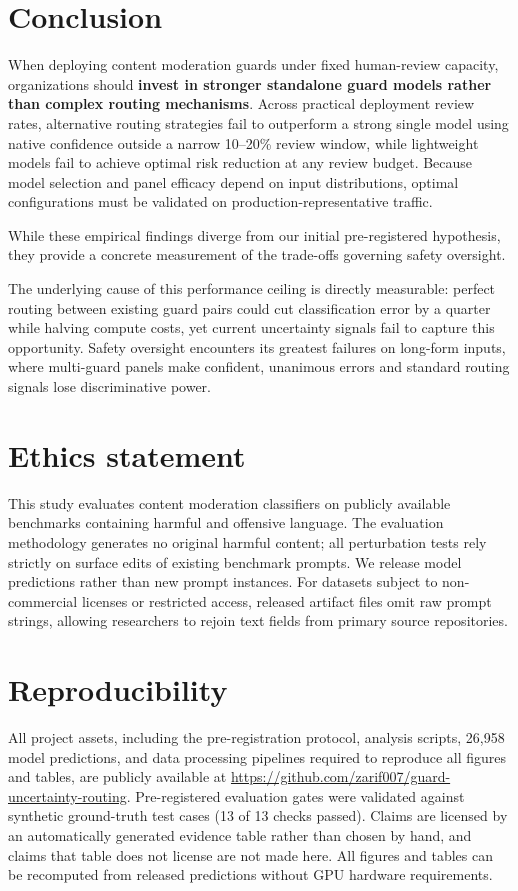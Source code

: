\documentclass[11pt]{article}
\begin{document}
\section{Conclusion}

When deploying content moderation guards under fixed human-review capacity, organizations should \textbf{invest in stronger standalone guard models rather than complex routing mechanisms}. Across practical deployment review rates, alternative routing strategies fail to outperform a strong single model using native confidence outside a narrow 10--20\% review window, while lightweight models fail to achieve optimal risk reduction at any review budget. Because model selection and panel efficacy depend on input distributions, optimal configurations must be validated on production-representative traffic.

While these empirical findings diverge from our initial pre-registered hypothesis, they provide a concrete measurement of the trade-offs governing safety oversight.

The underlying cause of this performance ceiling is directly measurable: perfect routing between existing guard pairs could cut classification error by a quarter while halving compute costs, yet current uncertainty signals fail to capture this opportunity. Safety oversight encounters its greatest failures on long-form inputs, where multi-guard panels make confident, unanimous errors and standard routing signals lose discriminative power.

\section*{Ethics statement}

This study evaluates content moderation classifiers on publicly available benchmarks containing harmful and offensive language. The evaluation methodology generates no original harmful content; all perturbation tests rely strictly on surface edits of existing benchmark prompts. We release model predictions rather than new prompt instances. For datasets subject to non-commercial licenses or restricted access, released artifact files omit raw prompt strings, allowing researchers to rejoin text fields from primary source repositories.

\section*{Reproducibility}

All project assets, including the pre-registration protocol, analysis scripts, 26,958 model predictions, and data processing pipelines required to reproduce all figures and tables, are publicly available at \url{https://github.com/zarif007/guard-uncertainty-routing}. Pre-registered evaluation gates were validated against synthetic ground-truth test cases (13 of 13 checks passed). Claims are licensed by an automatically generated evidence table rather than chosen by hand, and claims that table does not license are not made here. All figures and tables can be recomputed from released predictions without GPU hardware requirements.
\end{document}
